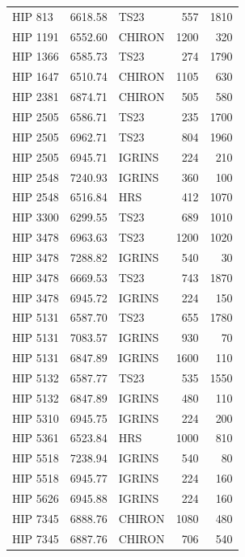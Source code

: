 \begin{scriptsize}
\begin{longtable}{|l|rlrr|}
     HIP 813 &  6618.58 &       TS23 &      557 &  1810 \\
    HIP 1191 &  6552.60 &     CHIRON &     1200 &   320 \\
    HIP 1366 &  6585.73 &       TS23 &      274 &  1790 \\
    HIP 1647 &  6510.74 &     CHIRON &     1105 &   630 \\
    HIP 2381 &  6874.71 &     CHIRON &      505 &   580 \\
    HIP 2505 &  6586.71 &       TS23 &      235 &  1700 \\
    HIP 2505 &  6962.71 &       TS23 &      804 &  1960 \\
    HIP 2505 &  6945.71 &     IGRINS &      224 &   210 \\
    HIP 2548 &  7240.93 &     IGRINS &      360 &   100 \\
    HIP 2548 &  6516.84 &        HRS &      412 &  1070 \\
    HIP 3300 &  6299.55 &       TS23 &      689 &  1010 \\
    HIP 3478 &  6963.63 &       TS23 &     1200 &  1020 \\
    HIP 3478 &  7288.82 &     IGRINS &      540 &    30 \\
    HIP 3478 &  6669.53 &       TS23 &      743 &  1870 \\
    HIP 3478 &  6945.72 &     IGRINS &      224 &   150 \\
    HIP 5131 &  6587.70 &       TS23 &      655 &  1780 \\
    HIP 5131 &  7083.57 &     IGRINS &      930 &    70 \\
    HIP 5131 &  6847.89 &     IGRINS &     1600 &   110 \\
    HIP 5132 &  6587.77 &       TS23 &      535 &  1550 \\
    HIP 5132 &  6847.89 &     IGRINS &      480 &   110 \\
    HIP 5310 &  6945.75 &     IGRINS &      224 &   200 \\
    HIP 5361 &  6523.84 &        HRS &     1000 &   810 \\
    HIP 5518 &  7238.94 &     IGRINS &      540 &    80 \\
    HIP 5518 &  6945.77 &     IGRINS &      224 &   160 \\
    HIP 5626 &  6945.88 &     IGRINS &      224 &   160 \\
    HIP 7345 &  6888.76 &     CHIRON &     1080 &   480 \\
    HIP 7345 &  6887.76 &     CHIRON &      706 &   540 \\

\end{longtable}
\end{scriptsize}
